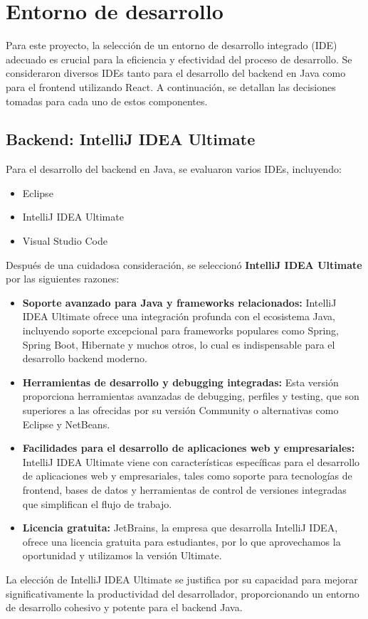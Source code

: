 \section{Entorno de desarrollo}
Para este proyecto, la selección de un entorno de desarrollo integrado (IDE) adecuado es crucial para la eficiencia y efectividad del proceso de desarrollo. Se consideraron diversos IDEs tanto para el desarrollo del backend en Java como para el frontend utilizando React. A continuación, se detallan las decisiones tomadas para cada uno de estos componentes.

\subsection{Backend: IntelliJ IDEA Ultimate}
Para el desarrollo del backend en Java, se evaluaron varios IDEs, incluyendo:
\begin{itemize}
    \item Eclipse
    \item IntelliJ IDEA Ultimate
    \item Visual Studio Code
\end{itemize}
Después de una cuidadosa consideración, se seleccionó \textbf{IntelliJ IDEA Ultimate}\cite{IntelliJ} por las siguientes razones:
\begin{itemize}
    \item \textbf{Soporte avanzado para Java y frameworks relacionados:} IntelliJ IDEA Ultimate ofrece una integración profunda con el ecosistema Java, incluyendo soporte excepcional para frameworks populares como Spring, Spring Boot, Hibernate y muchos otros, lo cual es indispensable para el desarrollo backend moderno.
    \item \textbf{Herramientas de desarrollo y debugging integradas:} Esta versión proporciona herramientas avanzadas de debugging, perfiles y testing, que son superiores a las ofrecidas por su versión Community o alternativas como Eclipse y NetBeans.
    \item \textbf{Facilidades para el desarrollo de aplicaciones web y empresariales:} IntelliJ IDEA Ultimate viene con características específicas para el desarrollo de aplicaciones web y empresariales, tales como soporte para tecnologías de frontend, bases de datos y herramientas de control de versiones integradas que simplifican el flujo de trabajo.
    \item \textbf{Licencia gratuita:} JetBrains, la empresa que desarrolla IntelliJ IDEA, ofrece una licencia gratuita para estudiantes, por lo que aprovechamos la oportunidad y utilizamos la versión Ultimate.
\end{itemize}
La elección de IntelliJ IDEA Ultimate se justifica por su capacidad para mejorar significativamente la productividad del desarrollador, proporcionando un entorno de desarrollo cohesivo y potente para el backend Java.

